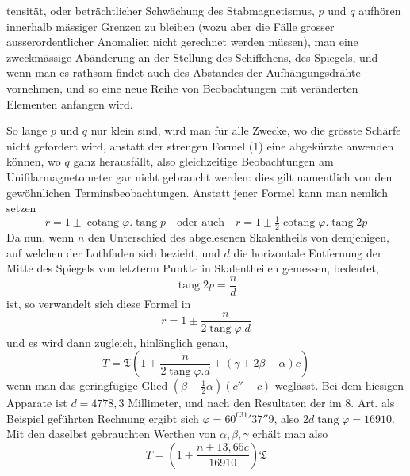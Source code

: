 \par\clearpage
{}
\noindent tensität, oder beträchtlicher Schwächung des Stabmagnetismus, $p$ und $q$ aufhören innerhalb mässiger Grenzen zu bleiben (wozu aber die Fälle grosser ausserordentlicher Anomalien nicht gerechnet werden müssen), man eine zweckmässige Abänderung an der Stellung des Schiffchens, des Spiegels, und wenn man es rathsam findet auch des Abstandes der Aufhängungsdrähte vornehmen, und so eine neue Reihe von Beobachtungen mit veränderten Elementen anfangen wird.

So lange $p$ und $q$ nur klein sind, wird man für alle Zwecke, wo die grösste Schärfe nicht gefordert wird, anstatt der strengen Formel (1) eine abgekürzte anwenden können, wo $q$ ganz herausfällt, also gleichzeitige Beobachtungen am Unifilarmagnetometer gar nicht gebraucht werden: dies gilt namentlich von den gewöhnlichen Terminsbeobachtungen. Anstatt jener Formel kann man nemlich setzen
\[
r=1\pm\operatorname{cotang}\varphi.\operatorname{tang}p\quad\text{oder auch}\quad r=1\pm\tfrac12\operatorname{cotang}\varphi.\operatorname{tang}2p
\]
Da nun, wenn $n$ den Unterschied des abgelesenen Skalentheils von demjenigen, auf welchen der Lothfaden sich bezieht, und $d$ die horizontale Entfernung der Mitte des Spiegels von letzterm Punkte in Skalentheilen gemessen, bedeutet,
\[
\operatorname{tang}2p=\frac{n}{d}
\]
ist, so verwandelt sich diese Formel in
\[
r=1\pm\frac{n}{2\operatorname{tang}\varphi.d}
\]
und es wird dann zugleich, hinlänglich genau,
\[
T=\mathfrak{T}(1\pm\frac{n}{2\operatorname{tang}\varphi.d}+(\gamma+2\beta-\alpha)c)
\]
wenn man das geringfügige Glied $(\beta-\tfrac12\alpha)(c''-c)$ weglässt. Bei dem hiesigen Apparate ist $d=4778{,}3$ Millimeter, und nach den Resultaten der im 8. Art. als Beispiel geführten Rechnung ergibt sich $\varphi=60^031'37''9$, also $2d\operatorname{tang}\varphi=16910$. Mit den daselbst gebrauchten Werthen von $\alpha,\beta,\gamma$ erhält man also
\[
T=(1+\frac{n+13{,}65c}{16910})\mathfrak{T}
\]
